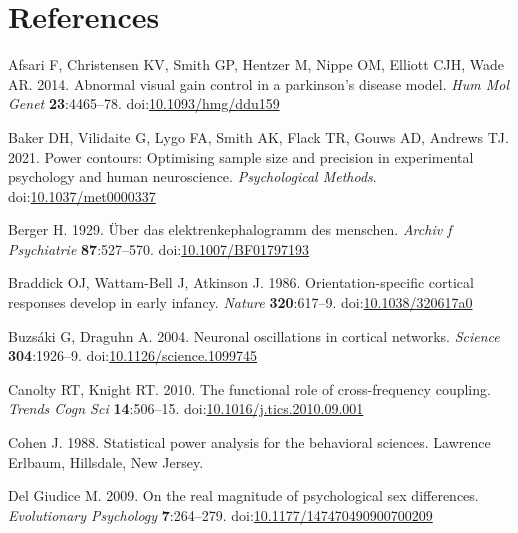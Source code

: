 \documentclass[]{article}
\begin{document}
\hypertarget{references}{%
\section*{References}\label{references}}

\hypertarget{refs}{}
\leavevmode\hypertarget{ref-Afsari2014}{}%
Afsari F, Christensen KV, Smith GP, Hentzer M, Nippe OM, Elliott CJH, Wade AR. 2014. Abnormal visual gain control in a parkinson's disease model. \emph{Hum Mol Genet} \textbf{23}:4465--78. doi:\href{https://doi.org/10.1093/hmg/ddu159}{10.1093/hmg/ddu159}

\leavevmode\hypertarget{ref-Baker2021}{}%
Baker DH, Vilidaite G, Lygo FA, Smith AK, Flack TR, Gouws AD, Andrews TJ. 2021. Power contours: Optimising sample size and precision in experimental psychology and human neuroscience. \emph{Psychological Methods}. doi:\href{https://doi.org/10.1037/met0000337}{10.1037/met0000337}

\leavevmode\hypertarget{ref-Berger1929}{}%
Berger H. 1929. Über das elektrenkephalogramm des menschen. \emph{Archiv f Psychiatrie} \textbf{87}:527--570. doi:\href{https://doi.org/10.1007/BF01797193}{10.1007/BF01797193}

\leavevmode\hypertarget{ref-Braddick1986}{}%
Braddick OJ, Wattam-Bell J, Atkinson J. 1986. Orientation-specific cortical responses develop in early infancy. \emph{Nature} \textbf{320}:617--9. doi:\href{https://doi.org/10.1038/320617a0}{10.1038/320617a0}

\leavevmode\hypertarget{ref-Buzsaki2004}{}%
Buzsáki G, Draguhn A. 2004. Neuronal oscillations in cortical networks. \emph{Science} \textbf{304}:1926--9. doi:\href{https://doi.org/10.1126/science.1099745}{10.1126/science.1099745}

\leavevmode\hypertarget{ref-Canolty2010}{}%
Canolty RT, Knight RT. 2010. The functional role of cross-frequency coupling. \emph{Trends Cogn Sci} \textbf{14}:506--15. doi:\href{https://doi.org/10.1016/j.tics.2010.09.001}{10.1016/j.tics.2010.09.001}

\leavevmode\hypertarget{ref-Cohen1988}{}%
Cohen J. 1988. Statistical power analysis for the behavioral sciences. Lawrence Erlbaum, Hillsdale, New Jersey.

\leavevmode\hypertarget{ref-Giudice2009}{}%
Del Giudice M. 2009. On the real magnitude of psychological sex differences. \emph{Evolutionary Psychology} \textbf{7}:264--279. doi:\href{https://doi.org/10.1177/147470490900700209}{10.1177/147470490900700209}
\end{document}
